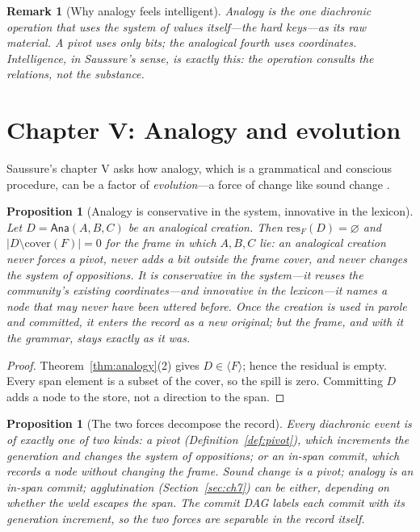 \documentclass[11pt,a4paper]{article}
\newtheorem{proposition}[principle]{Proposition}
\newtheorem{remark}[principle]{Remark}
\theoremstyle{remark}
\newcommand{\res}{\ensuremath{\mathrm{res}}}             %
\newcommand{\spanof}[1]{\ensuremath{\langle #1\rangle}}  %
\newcommand{\cover}{\ensuremath{\mathrm{cover}}}         %
\newcommand{\Ana}{\ensuremath{\mathsf{Ana}}}             %
\begin{document}
\begin{remark}[Why analogy feels intelligent]
Analogy is the one diachronic operation that uses the system of values
itself---the hard keys---as its raw material. A pivot uses only bits; the
analogical fourth uses coordinates. Intelligence, in Saussure's sense, is
exactly this: the operation consults the relations, not the substance.
\end{remark}

\section{Chapter V: Analogy and evolution}
\label{sec:ch5}

Saussure's chapter V asks how analogy, which is a grammatical and conscious
procedure, can be a factor of \emph{evolution}---a force of change like sound
change \cite[Part III, ch.~V]{harris1983}.

\begin{proposition}[Analogy is conservative in the system, innovative in the lexicon]
\label{prop:analogy-evolution}
Let $D = \Ana(A,B,C)$ be an analogical creation. Then
$\res_F(D) = \varnothing$ and $|D \setminus \cover(F)| = 0$ for the frame in
which $A,B,C$ lie: an analogical creation never forces a pivot, never adds a
bit outside the frame cover, and never changes the system of oppositions. It
is \emph{conservative} in the system---it reuses the community's existing
coordinates---and \emph{innovative} in the lexicon---it names a node that may
never have been uttered before. Once the creation is used in parole and
committed, it enters the record as a new original; but the frame, and with it
the grammar, stays exactly as it was.
\end{proposition}

\begin{proof}
Theorem~\ref{thm:analogy}(2) gives $D \in \spanof{F}$; hence the residual is
empty. Every span element is a subset of the cover, so the spill is zero.
Committing $D$ adds a node to the store, not a direction to the span.
\end{proof}

\begin{proposition}[The two forces decompose the record]
\label{prop:decomposition}
Every diachronic event is of exactly one of two kinds: a \emph{pivot}
(Definition~\ref{def:pivot}), which increments the generation and changes the
system of oppositions; or an \emph{in-span commit}, which records a node
without changing the frame. Sound change is a pivot; analogy is an in-span
commit; agglutination (Section~\ref{sec:ch7}) can be either, depending on
whether the weld escapes the span. The commit DAG labels each commit with its
generation increment, so the two forces are separable in the record itself.
\end{proposition}
\end{document}
